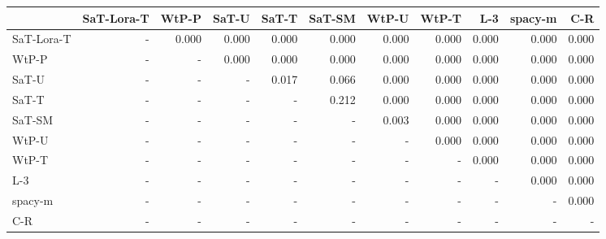 \begin{tabular}{lrrrrrrrrrr}
\toprule
 & SaT-Lora-T & WtP-P & SaT-U & SaT-T & SaT-SM & WtP-U & WtP-T & L-3 & spacy-m & C-R \\
\midrule
SaT-Lora-T & - & 0.000 & 0.000 & 0.000 & 0.000 & 0.000 & 0.000 & 0.000 & 0.000 & 0.000 \\
WtP-P & - & - & 0.000 & 0.000 & 0.000 & 0.000 & 0.000 & 0.000 & 0.000 & 0.000 \\
SaT-U & - & - & - & 0.017 & 0.066 & 0.000 & 0.000 & 0.000 & 0.000 & 0.000 \\
SaT-T & - & - & - & - & 0.212 & 0.000 & 0.000 & 0.000 & 0.000 & 0.000 \\
SaT-SM & - & - & - & - & - & 0.003 & 0.000 & 0.000 & 0.000 & 0.000 \\
WtP-U & - & - & - & - & - & - & 0.000 & 0.000 & 0.000 & 0.000 \\
WtP-T & - & - & - & - & - & - & - & 0.000 & 0.000 & 0.000 \\
L-3 & - & - & - & - & - & - & - & - & 0.000 & 0.000 \\
spacy-m & - & - & - & - & - & - & - & - & - & 0.000 \\
C-R & - & - & - & - & - & - & - & - & - & - \\
\bottomrule
\end{tabular}

